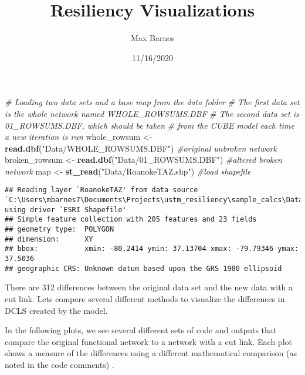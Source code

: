 \documentclass[
]{article}
\title{Resiliency Visualizations}
\author{Max Barnes}
\date{11/16/2020}
\newenvironment{Shaded}{\begin{snugshade}}{\end{snugshade}}
\newcommand{\CommentTok}[1]{\textcolor[rgb]{0.56,0.35,0.01}{\textit{#1}}}
\newcommand{\KeywordTok}[1]{\textcolor[rgb]{0.13,0.29,0.53}{\textbf{#1}}}
\newcommand{\NormalTok}[1]{#1}
\newcommand{\StringTok}[1]{\textcolor[rgb]{0.31,0.60,0.02}{#1}}
\begin{document}
\maketitle

\begin{Shaded}
\begin{Highlighting}[]
\CommentTok{# Loading two data sets and a base map from the data folder}
\CommentTok{# The first data set is the whole network named WHOLE_ROWSUMS.DBF}
\CommentTok{# The second data set is 01_ROWSUMS.DBF, which should be taken}
\CommentTok{# from the CUBE model each time a new iteration is run}
\NormalTok{whole_rowsum <-}\StringTok{ }\KeywordTok{read.dbf}\NormalTok{(}\StringTok{"Data/WHOLE_ROWSUMS.DBF"}\NormalTok{)  }\CommentTok{#original unbroken network}
\NormalTok{broken_rowsum <-}\StringTok{ }\KeywordTok{read.dbf}\NormalTok{(}\StringTok{"Data/01_ROWSUMS.DBF"}\NormalTok{)    }\CommentTok{#altered broken network}
\NormalTok{map <-}\StringTok{ }\KeywordTok{st_read}\NormalTok{(}\StringTok{"Data/RoanokeTAZ.shp"}\NormalTok{)               }\CommentTok{#load shapefile}
\end{Highlighting}
\end{Shaded}

\begin{verbatim}
## Reading layer `RoanokeTAZ' from data source `C:\Users\mbarnes7\Documents\Projects\ustm_resiliency\sample_calcs\Data\RoanokeTAZ.shp' using driver `ESRI Shapefile'
## Simple feature collection with 205 features and 23 fields
## geometry type:  POLYGON
## dimension:      XY
## bbox:           xmin: -80.2414 ymin: 37.13704 xmax: -79.79346 ymax: 37.5036
## geographic CRS: Unknown datum based upon the GRS 1980 ellipsoid
\end{verbatim}

There are 312 differences between the original data set and the new data
with a cut link. Lets compare several different methods to visualize the
differences in DCLS created by the model.

In the following plots, we see several different sets of code and
outputs that compare the original functional network to a network with a
cut link. Each plot shows a measure of the differences using a different
mathematical comparison (as noted in the code comments) .
\end{document}
